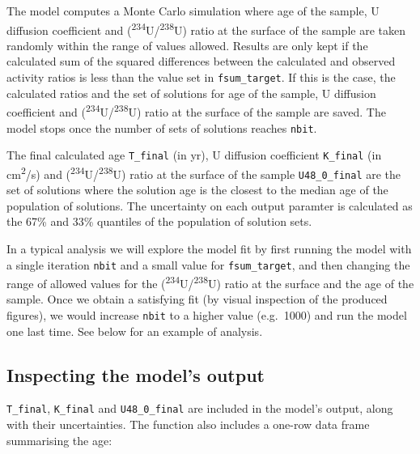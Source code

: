 \documentclass[]{elsarticle} %
\begin{document}
The model computes a Monte Carlo simulation where age of the sample, U diffusion coefficient and (\textsuperscript{234}U/\textsuperscript{238}U) ratio at the surface of the sample are taken randomly within the range of values allowed. Results are only kept if the calculated sum of the squared differences between the calculated and observed activity ratios is less than the value set in \texttt{fsum\_target}. If this is the case, the calculated ratios and the set of solutions for age of the sample, U diffusion coefficient and (\textsuperscript{234}U/\textsuperscript{238}U) ratio at the surface of the sample are saved. The model stops once the number of sets of solutions reaches \texttt{nbit}.

The final calculated age \texttt{T\_final} (in yr), U diffusion coefficient \texttt{K\_final} (in cm\textsuperscript{2}/s) and (\textsuperscript{234}U/\textsuperscript{238}U) ratio at the surface of the sample \texttt{U48\_0\_final} are the set of solutions where the solution age is the closest to the median age of the population of solutions. The uncertainty on each output paramter is calculated as the 67\% and 33\% quantiles of the population of solution sets.

In a typical analysis we will explore the model fit by first running the model with a single iteration \texttt{nbit} and a small value for \texttt{fsum\_target}, and then changing the range of allowed values for the (\textsuperscript{234}U/\textsuperscript{238}U) ratio at the surface and the age of the sample. Once we obtain a satisfying fit (by visual inspection of the produced figures), we would increase \texttt{nbit} to a higher value (e.g.~1000) and run the model one last time. See below for an example of analysis.

\newpage

\hypertarget{inspecting-the-models-output}{%
\subsection{Inspecting the model's output}\label{inspecting-the-models-output}}

\texttt{T\_final}, \texttt{K\_final} and \texttt{U48\_0\_final} are included in the model's output, along with their uncertainties. The function also includes a one-row data frame summarising the age:
\end{document}
